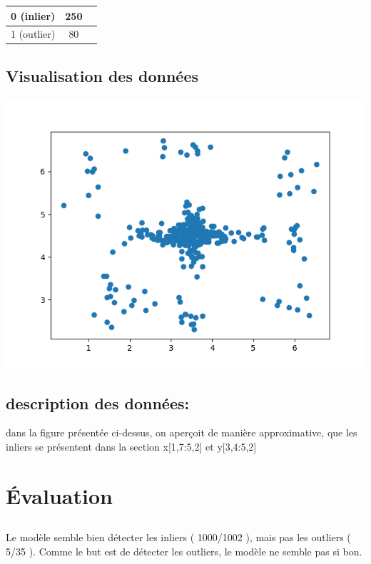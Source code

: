\documentclass[a4paper]{article}
\begin{document}
\begin{center}
   \begin{tabular}{ | l | c | r | }
     \hline
     0 (inlier) & 250  \\ \hline
     1 (outlier) &80  \\ \hline
   \end{tabular}
 \end{center}

\subsection{Visualisation des données}
\includegraphics[width=\textwidth]{Figure_1.png}

\subsection{description des données:}

    dans la figure présentée ci-dessus, on aperçoit de manière approximative,  que les inliers se présentent dans la section  x[1,7:5,2]  et y[3,4:5,2]


\section{Évaluation}\label{evaluation}

\subsection{}

Le modèle semble bien détecter les inliers (
1000/1002 ), mais pas les outliers ( 5/35 ). Comme le but est de
détecter les outliers, le modèle ne semble pas si bon.\\
\end{document}
